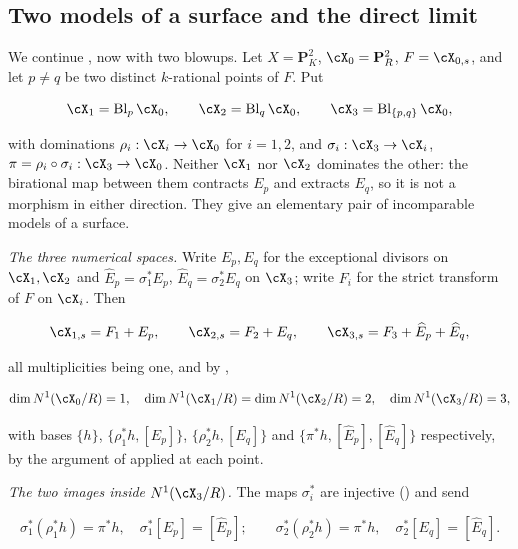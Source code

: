 \subsection{Two models of a surface and the direct limit}
\label{sec:ch20-ex-two-model}

\begin{example}
\label{ex:ch20-two-model-surface}
We continue , now with two blowups.  Let
$X=\mathbf P^2_K$, $\cX_0=\mathbf P^2_R$, $F=\cX_{0,s}$, and let
$p\neq q$ be two distinct $k$-rational points of $F$.  Put

\[
 \cX_1=\operatorname{Bl}_p\cX_0,\qquad
 \cX_2=\operatorname{Bl}_q\cX_0,\qquad
 \cX_3=\operatorname{Bl}_{\{p,q\}}\cX_0 ,
\]

with dominations $\rho_i:\cX_i\to\cX_0$ for $i=1,2$, and
$\sigma_i:\cX_3\to\cX_i$, $\pi=\rho_i\circ\sigma_i:\cX_3\to\cX_0$.
Neither $\cX_1$ nor $\cX_2$ dominates the other: the birational map
between them contracts $E_p$ and extracts $E_q$, so it is not a
morphism in either direction.  They give an elementary pair of incomparable
models of a surface.

\emph{The three numerical spaces.}  Write $E_p,E_q$ for the exceptional
divisors on $\cX_1,\cX_2$ and $\widehat E_p=\sigma_1^*E_p$,
$\widehat E_q=\sigma_2^*E_q$ on $\cX_3$; write $F_i$ for the strict
transform of $F$ on $\cX_i$.  Then

\[
 \cX_{1,s}=F_1+E_p,\qquad
 \cX_{2,s}=F_2+E_q,\qquad
 \cX_{3,s}=F_3+\widehat E_p+\widehat E_q ,
\]

all multiplicities being one, and by ,

\begin{equation}
\label{eq:ch20-two-model-dimensions}
 \dim N^1(\cX_0/R)=1,\quad
 \dim N^1(\cX_1/R)=\dim N^1(\cX_2/R)=2,\quad
 \dim N^1(\cX_3/R)=3 ,
\end{equation}

with bases $\{h\}$, $\{\rho_1^*h,[E_p]\}$, $\{\rho_2^*h,[E_q]\}$ and
$\{\pi^*h,[\widehat E_p],[\widehat E_q]\}$ respectively, by the argument
of  applied at each point.

\emph{The two images inside $N^1(\cX_3/R)$.}  The maps $\sigma_i^*$ are
injective () and send

\[
 \sigma_1^*(\rho_1^*h)=\pi^*h,\quad
 \sigma_1^*[E_p]=[\widehat E_p];
 \qquad
 \sigma_2^*(\rho_2^*h)=\pi^*h,\quad
 \sigma_2^*[E_q]=[\widehat E_q].
\]


\end{example}

